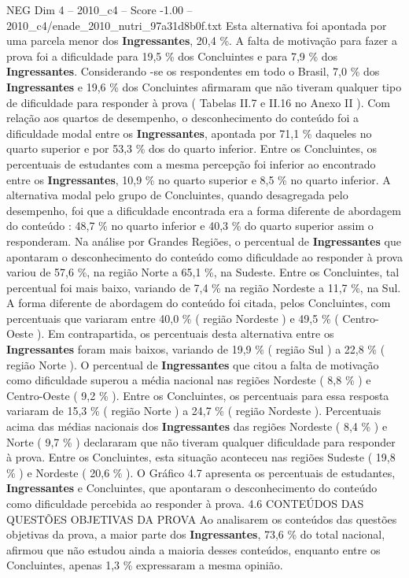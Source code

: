 \begin{textsample}{NEG Dim 4 – 2010\_c4 – Score -1.00 – 2010\_c4/enade\_2010\_nutri\_97a31d8b0f.txt}
Esta alternativa foi apontada por uma parcela menor dos \textbf{Ingressantes}, 20,4 \%.
A falta de motivação para fazer a prova foi a dificuldade para 19,5 \% dos Concluintes e para 7,9 \% dos \textbf{Ingressantes}.
Considerando -se os respondentes em todo o Brasil, 7,0 \% dos \textbf{Ingressantes} e 19,6 \% dos Concluintes afirmaram que não tiveram qualquer tipo de dificuldade para responder à prova ( Tabelas II.7 e II.16 no Anexo II ).
Com relação aos quartos de desempenho, o desconhecimento do conteúdo foi a dificuldade modal entre os \textbf{Ingressantes}, apontada por 71,1 \% daqueles no quarto superior e por 53,3 \% dos do quarto inferior.
Entre os Concluintes, os percentuais de estudantes com a mesma percepção foi inferior ao encontrado entre os \textbf{Ingressantes}, 10,9 \% no quarto superior e 8,5 \% no quarto inferior.
A alternativa modal pelo grupo de Concluintes, quando desagregada pelo desempenho, foi que a dificuldade encontrada era a forma diferente de abordagem do conteúdo : 48,7 \% no quarto inferior e 40,3 \% do quarto superior assim o responderam.
Na análise por Grandes Regiões, o percentual de \textbf{Ingressantes} que apontaram o desconhecimento do conteúdo como dificuldade ao responder à prova variou de 57,6 \%, na região Norte a 65,1 \%, na Sudeste.
Entre os Concluintes, tal percentual foi mais baixo, variando de 7,4 \% na região Nordeste a 11,7 \%, na Sul.
A forma diferente de abordagem do conteúdo foi citada, pelos Concluintes, com percentuais que variaram entre 40,0 \% ( região Nordeste ) e 49,5 \% ( Centro-Oeste ).
Em contrapartida, os percentuais desta alternativa entre os \textbf{Ingressantes} foram mais baixos, variando de 19,9 \% ( região Sul ) a 22,8 \% ( região Norte ).
O percentual de \textbf{Ingressantes} que citou a falta de motivação como dificuldade superou a média nacional nas regiões Nordeste ( 8,8 \% ) e Centro-Oeste ( 9,2 \% ).
Entre os Concluintes, os percentuais para essa resposta variaram de 15,3 \% ( região Norte ) a 24,7 \% ( região Nordeste ).
Percentuais acima das médias nacionais dos \textbf{Ingressantes} das regiões Nordeste ( 8,4 \% ) e Norte ( 9,7 \% ) declararam que não tiveram qualquer dificuldade para responder à prova.
Entre os Concluintes, esta situação aconteceu nas regiões Sudeste ( 19,8 \% ) e Nordeste ( 20,6 \% ).
O Gráfico 4.7 apresenta os percentuais de estudantes, \textbf{Ingressantes} e Concluintes, que apontaram o desconhecimento do conteúdo como dificuldade percebida ao responder à prova. 4.6 CONTEÚDOS DAS QUESTÕES OBJETIVAS DA PROVA Ao analisarem os conteúdos das questões objetivas da prova, a maior parte dos \textbf{Ingressantes}, 73,6 \% do total nacional, afirmou que não estudou ainda a maioria desses conteúdos, enquanto entre os Concluintes, apenas 1,3 \% expressaram a mesma opinião.

\end{textsample}
